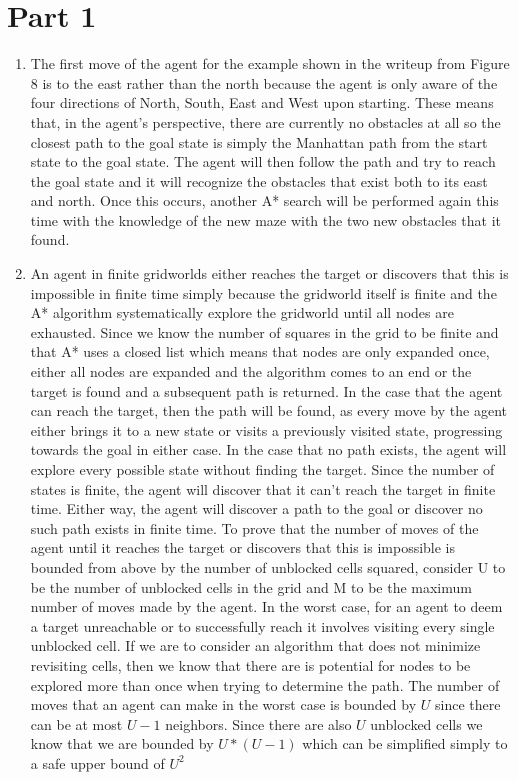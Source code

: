 \documentclass{article}
\begin{document}
\section*{Part 1}
\begin{enumerate}[label=\alph*.]
    \item  The first move of the agent for the example shown in the writeup from Figure 8 is to the east rather than the north because the agent is only aware of the four directions of North, South, East and West upon starting. These means that, in the agent's perspective, there are currently no obstacles at all so the closest path to the goal state is simply the Manhattan path from the start state to the goal state. The agent will then follow the path and try to reach the goal state and it will recognize the obstacles that exist both to its east and north. Once this occurs, another A* search will be performed again this time with the knowledge of the new maze with the two new obstacles that it found.

    \item An agent in finite gridworlds either reaches the target or discovers that this is impossible in finite time simply because the gridworld itself is finite and the A* algorithm systematically explore the gridworld until all nodes are exhausted. Since we know the number of squares in the grid to be finite and that A* uses a closed list which means that nodes are only expanded once, either all nodes are expanded and the algorithm comes to an end or the target is found and a subsequent path is returned. In the case that the agent can reach the target, then the path will be found, as every move by the agent either brings it to a new state or visits a previously visited state, progressing towards the goal in either case. In the case that no path exists, the agent will explore every possible state without finding the target. Since the number of states is finite, the agent will discover that it can't reach the target in finite time. Either way, the agent will discover a path to the goal or discover no such path exists in finite time. To prove that the number of moves of the agent until it reaches the target or discovers that this is impossible is bounded from above by the number of unblocked cells squared, consider U to be the number of unblocked cells in the grid and M to be the maximum number of moves made by the agent. In the worst case, for an agent to deem a target unreachable or to successfully reach it involves visiting every single unblocked cell. If we are to consider an algorithm that does not minimize revisiting cells, then we know that there are is potential for nodes to be explored more than once when trying to determine the path. The number of moves that an agent can make in the worst case is bounded by $U$ since there can be at most $U-1$ neighbors. Since there are also $U$ unblocked cells we know that we are bounded by $U*(U-1)$ which can be simplified simply to a safe upper bound of $U^2$
\end{enumerate}
\end{document}
